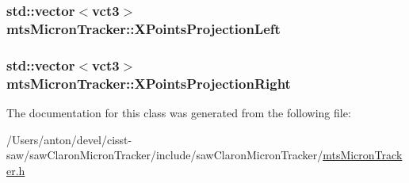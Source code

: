 \subsubsection[{X\+Points\+Projection\+Left}]{\setlength{\rightskip}{0pt plus 5cm}std\+::vector$<${\bf vct3}$>$ mts\+Micron\+Tracker\+::\+X\+Points\+Projection\+Left\hspace{0.3cm}{\ttfamily [protected]}}\label{classmts_micron_tracker_a2e35c998885291f730e1a55f990b464d}
\hypertarget{classmts_micron_tracker_a7e0cac34b4700293cd83d15e57ad057f}{}
\subsubsection[{X\+Points\+Projection\+Right}]{\setlength{\rightskip}{0pt plus 5cm}std\+::vector$<${\bf vct3}$>$ mts\+Micron\+Tracker\+::\+X\+Points\+Projection\+Right\hspace{0.3cm}{\ttfamily [protected]}}\label{classmts_micron_tracker_a7e0cac34b4700293cd83d15e57ad057f}


The documentation for this class was generated from the following file\+:\begin{DoxyCompactItemize}
\item 
/\+Users/anton/devel/cisst-\/saw/saw\+Claron\+Micron\+Tracker/include/saw\+Claron\+Micron\+Tracker/\hyperlink{mts_micron_tracker_8h}{mts\+Micron\+Tracker.\+h}\end{DoxyCompactItemize}
